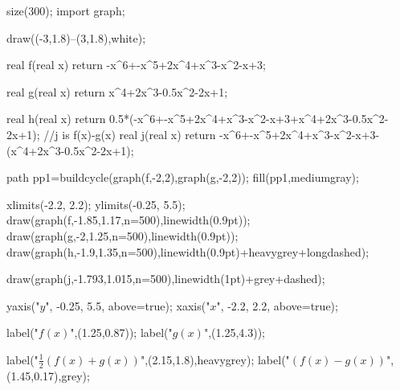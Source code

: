 	size(300);  
    import graph;
    
    draw((-3,1.8)--(3,1.8),white);

    real f(real x)
    {
    	return -x^6+-x^5+2x^4+x^3-x^2-x+3;
    }
    
    real g(real x)
    {
    	return x^4+2x^3-0.5x^2-2x+1;
    }
    
    real h(real x)
    {
    	return 0.5*(-x^6+-x^5+2x^4+x^3-x^2-x+3+x^4+2x^3-0.5x^2-2x+1);
    }
    //j is f(x)-g(x)
    real j(real x)
    {
    	return -x^6+-x^5+2x^4+x^3-x^2-x+3-(x^4+2x^3-0.5x^2-2x+1);
    }
    
    path pp1=buildcycle(graph(f,-2,2),graph(g,-2,2));
    fill(pp1,mediumgray);
    
    xlimits(-2.2, 2.2);
	ylimits(-0.25, 5.5);
    draw(graph(f,-1.85,1.17,n=500),linewidth(0.9pt));
    draw(graph(g,-2,1.25,n=500),linewidth(0.9pt));
    draw(graph(h,-1.9,1.35,n=500),linewidth(0.9pt)+heavygrey+longdashed);
    
	draw(graph(j,-1.793,1.015,n=500),linewidth(1pt)+grey+dashed);    
    
	yaxis("$y$", -0.25, 5.5, above=true);
	xaxis("$x$", -2.2, 2.2, above=true);
	
	label("$f(x)$",(1.25,0.87));
	label("$g(x)$",(1.25,4.3));
	
	label("$\frac{1}{2}\left(f(x)+g(x)\right)$",(2.15,1.8),heavygrey);
	label("$\left(f(x)-g(x)\right)$",(1.45,0.17),grey);